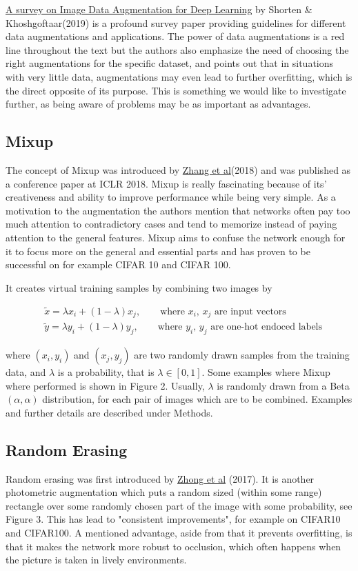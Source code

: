 \documentclass{article}
\begin{document}
\href{https://link.springer.com/article/10.1186/s40537-019-0197-0}{A survey on Image Data Augmentation for Deep Learning} by Shorten \& Khoshgoftaar(2019) is a profound survey paper providing guidelines for different data augmentations and applications. The power of data augmentations is a red line throughout the text but the authors also emphasize the need of choosing the right augmentations for the specific dataset, and points out that in situations with very little data, augmentations may even lead to further overfitting, which is the direct opposite of its purpose. This is something we would like to investigate further, as being aware of problems may be as important as advantages.


\subsection{Mixup}

The concept of Mixup was introduced by \href{https://arxiv.org/pdf/1710.09412.pdf}{Zhang et al}(2018) and was published as a conference paper at ICLR 2018. Mixup is really fascinating because of its' creativeness and ability to improve performance while being very simple. As a motivation to the augmentation the authors mention that networks often pay too much attention to contradictory cases and tend to memorize instead of paying attention to the general features. Mixup aims to confuse the network enough for it to focus more on the general and essential parts and has proven to be successful on for example CIFAR 10 and CIFAR 100.

It creates virtual training samples by combining two images by 

\begin{align*}
&\tilde{x} = \lambda x_i + (1-\lambda) x_j, \qquad \text{where $x_i$, $x_j$ are input vectors} \\
&\tilde{y} = \lambda y_i + (1-\lambda) y_j, \qquad \text{where $y_i$, $y_j$ are one-hot endoced labels}
\end{align*}


where $(x_i, y_i)$ and $(x_j, y_j)$ are two randomly drawn samples from the training data, and $\lambda$ 
is a probability, that is $\lambda \in [0,1]$. Some examples where Mixup where performed is shown in Figure 2.  Usually, $\lambda$ is randomly drawn from a Beta$(\alpha, \alpha)$ 
distribution, for each pair of images which are to be combined. Examples and further details are described under Methods. 


\subsection{Random Erasing}
Random erasing was first introduced by \href{https://arxiv.org/pdf/1708.04896.pdf}{Zhong et al} (2017). It is another photometric augmentation which puts a random sized (within some range) rectangle over some randomly chosen part of the image with some probability, see Figure 3. This has lead to "consistent improvements", for example on CIFAR10 and CIFAR100. A mentioned advantage, aside from that it prevents overfitting, is that it makes the network more robust to occlusion, which often happens when the picture is taken in lively environments.
\end{document}
